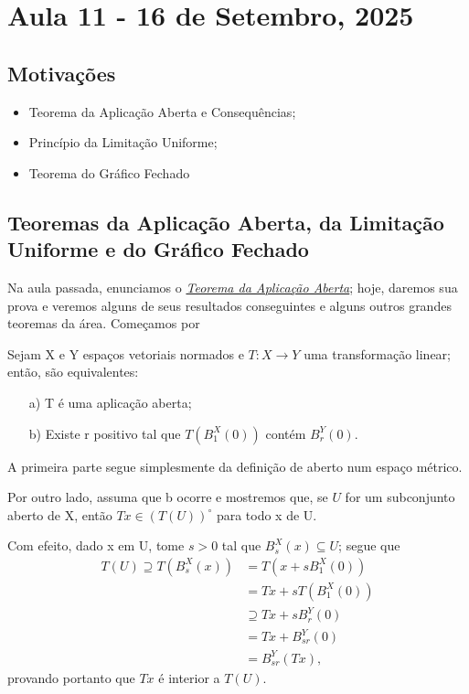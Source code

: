 \documentclass[../functional_analysis.tex]{subfiles}
\begin{document}
\section{Aula 11 - 16 de Setembro, 2025}
\subsection{Motivações}
\begin{itemize}
	\item Teorema da Aplicação Aberta e Consequências;
	\item Princípio da Limitação Uniforme;
	\item Teorema do Gráfico Fechado
\end{itemize}
\subsection{Teoremas da Aplicação Aberta, da Limitação Uniforme e do Gráfico Fechado}
Na aula passada, enunciamos o \hyperlink{open_application}{\textit{Teorema da Aplicação Aberta}}; hoje, daremos sua prova e veremos alguns de seus resultados conseguintes e alguns outros grandes teoremas da área. Começamos por
\begin{lemma*}
	Sejam X e Y espaços vetoriais normados e \(T:X\rightarrow Y\) uma transformação linear; então, são equivalentes:
	\begin{itemize}
		\item[a)] T é uma aplicação aberta;
		\item[b)] Existe r positivo tal que \(T(B_{1}^{X}(0))\) contém \(B_{r}^{Y}(0)\).
	\end{itemize}
\end{lemma*}
\begin{proof*}
	A primeira parte segue simplesmente da definição de aberto num espaço métrico.

	Por outro lado, assuma que b ocorre e mostremos que, se \(U\) for um subconjunto aberto de X, então \(Tx\in (T(U))^{\circ }\) para todo x de U.

	Com efeito, dado x em U, tome \(s> 0\) tal que \(B_{s}^{X}(x)\subseteq U\); segue que
	\begin{align*}
		T(U)\supseteq T(B_{s}^{X}(x)) & = T(x + sB_{1}^{X}(0))       \\
		                              & = Tx + sT(B_{1}^{X}(0))      \\
		                              & \supseteq Tx + sB_{r}^{Y}(0) \\
		                              & = Tx + B_{sr}^{Y}(0)         \\
		                              & = B_{sr}^{Y}(Tx),
	\end{align*}
	provando portanto que \(Tx\) é interior a \(T(U)\). \qedsymbol
\end{proof*}
\end{document}
